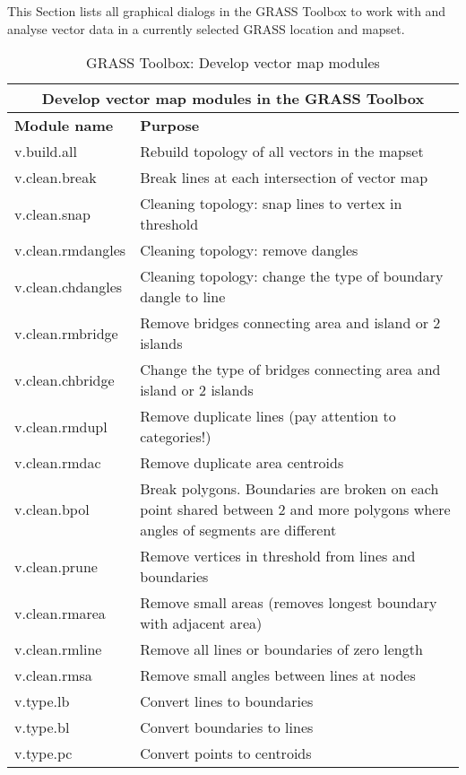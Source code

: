 This Section lists all graphical dialogs in the GRASS Toolbox to work with
and analyse vector data in a currently selected GRASS location and mapset.

\begin{table}[ht]
\centering
\caption{GRASS Toolbox: Develop vector map modules}\medskip
 \begin{tabular}{|p{4cm}|p{12cm}|}
  \hline \multicolumn{2}{|c|}{\textbf{Develop vector map modules in the GRASS
  Toolbox}} \\
  \hline \textbf{Module name} & \textbf{Purpose} \\
  \hline v.build.all & Rebuild topology of all vectors in the mapset \\
  \hline v.clean.break & Break lines at each intersection of vector map \\
  \hline v.clean.snap & Cleaning topology: snap lines to vertex in threshold \\
  \hline v.clean.rmdangles & Cleaning topology: remove dangles \\
  \hline v.clean.chdangles & Cleaning topology: change the type of boundary
  dangle to line \\
  \hline v.clean.rmbridge & Remove bridges connecting area and island or 2
  islands \\
  \hline v.clean.chbridge & Change the type of bridges connecting area and
  island or 2 islands \\
  \hline v.clean.rmdupl & Remove duplicate lines (pay attention to
  categories!) \\
  \hline v.clean.rmdac & Remove duplicate area centroids \\
  \hline v.clean.bpol & Break polygons. Boundaries are broken on each
  point shared between 2 and more polygons where angles of segments are
  different \\
  \hline v.clean.prune & Remove vertices in threshold from lines and
  boundaries \\
  \hline v.clean.rmarea & Remove small areas (removes longest boundary with
  adjacent area) \\
  \hline v.clean.rmline & Remove all lines or boundaries of zero length \\
  \hline v.clean.rmsa & Remove small angles between lines at nodes \\
  \hline v.type.lb & Convert lines to boundaries \\
  \hline v.type.bl & Convert boundaries to lines \\
  \hline v.type.pc & Convert points to centroids \\

\end{tabular}
\end{table}
